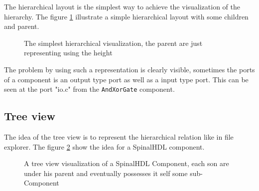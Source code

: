 The hierarchical layout is the simplest way to achieve the visualization of the
hierarchy. The figure \ref{fig:hierarchical-layout-simple} illustrate a simple
hierarchical layout with some children and parent.

\begin{figure}[H]
  \centering
  \caption[Simple hierarchical layout for diagram visualization]{The simplest
    hierarchical visualization, the parent are just representing using the height}
  \label{fig:hierarchical-layout-simple}
\end{figure}

The problem by using such a representation is clearly visible, sometimes the
ports of a component is an output type port as well as a input type port.
This can be seen at the port "io.c" from the \texttt{AndXorGate} component.

\subsection{Tree view}

The idea of the tree view is to represent the hierarchical relation like in file
explorer. The figure \ref{fig:tree-view} show the idea for a SpinalHDL
component.

\begin{figure}[H]
  \centering
  \caption[SpinalHDL's Component visualization with tree view]{A tree view
    visualization of a SpinalHDL Component, each son are under his parent and
    eventually possesses it self some sub-Component}
  \label{fig:tree-view}
\end{figure}

